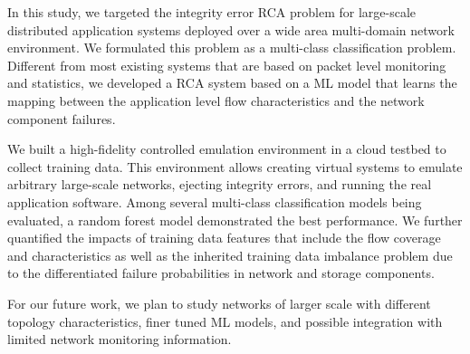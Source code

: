 In this study, we targeted the integrity error RCA problem for large-scale distributed application systems deployed over a wide area multi-domain network environment. We formulated this problem as a multi-class classification problem. Different from most existing systems that are based on packet level monitoring and statistics,  we developed a RCA system based on a ML model that learns the mapping between the application level flow characteristics and the network component failures. 

We built a high-fidelity controlled emulation environment in a cloud testbed to collect training data. This environment allows creating virtual systems to emulate arbitrary large-scale networks, ejecting integrity errors, and running the real application software. 
Among several multi-class classification models being evaluated, a random forest model demonstrated the best performance. We further quantified the impacts of training data features that include the flow coverage and characteristics as well as the inherited training data imbalance problem due to the differentiated failure probabilities in network and storage components. 

For our future work, we plan to study networks of larger scale with different topology characteristics, finer tuned ML models, and possible integration with limited network monitoring information. 
